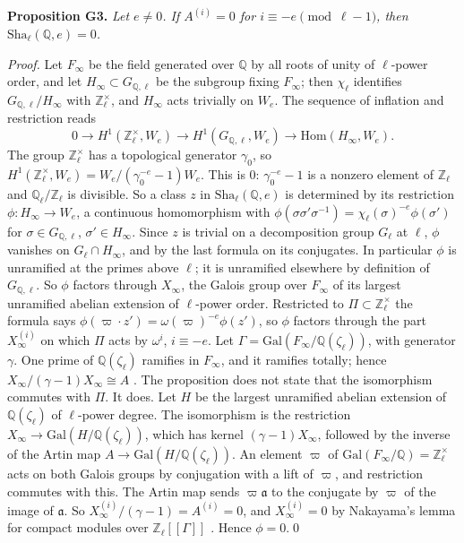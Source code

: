 \documentclass[11pt,letterpaper]{article}
\newcommand{\Z}{\mathbb Z}\newcommand{\Q}{\mathbb Q}\newcommand{\C}{\mathbb C}
\begin{document}
\textbf{Proposition G3.} \emph{Let $e\ne0$. If $A^{(i)}=0$ for $i\equiv-e\pmod{\ell-1}$, then
$\mathrm{Sha}_\ell(\Q,e)=0$.}

\emph{Proof.} Let $F_\infty$ be the field generated over $\Q$ by all roots of unity of $\ell$-power order,
and let $H_\infty\subset G_{\Q,\ell}$ be the subgroup fixing
$F_\infty$; then $\chi_\ell$ identifies $G_{\Q,\ell}/H_\infty$ with $\Z_\ell^\times$, and $H_\infty$ acts trivially on $W_e$.
The sequence of inflation and restriction reads
\begin{equation}\label{D:342}
 0\to H^1(\Z_\ell^\times,W_e)\to H^1(G_{\Q,\ell},W_e)\to\mathrm{Hom}(H_\infty,W_e).
\end{equation}
The group $\Z_\ell^\times$ has a topological generator $\gamma_0$, so $H^1(\Z_\ell^\times,W_e)=W_e/(\gamma_0^{-e}-1)W_e$.
This is $0$: $\gamma_0^{-e}-1$ is a nonzero element of $\Z_\ell$ and $\Q_\ell/\Z_\ell$ is divisible. So a class $z$
in $\mathrm{Sha}_\ell(\Q,e)$ is determined by its restriction $\phi\colon H_\infty\to W_e$, a continuous
homomorphism with $\phi(\sigma\sigma'\sigma^{-1})=\chi_\ell(\sigma)^{-e}\phi(\sigma')$ for $\sigma\in G_{\Q,\ell}$,
$\sigma'\in H_\infty$. Since $z$ is trivial on a decomposition group
$G_\ell$ at $\ell$, $\phi$ vanishes on $G_\ell\cap H_\infty$, and by the last formula on its conjugates. In particular $\phi$ is
unramified at the primes above $\ell$; it is unramified elsewhere by definition of $G_{\Q,\ell}$. So $\phi$
factors through $X_\infty$, the Galois group over $F_\infty$ of its largest unramified abelian extension of
$\ell$-power order. Restricted to $\Pi\subset\Z_\ell^\times$ the formula says
$\phi(\varpi\cdot z')=\omega(\varpi)^{-e}\phi(z')$, so $\phi$ factors through the part $X_\infty^{(i)}$ on
which $\Pi$ acts by $\omega^{i}$, $i\equiv-e$. Let $\Gamma=\mathrm{Gal}(F_\infty/\Q(\zeta_\ell))$, with
generator $\gamma$. One prime of $\Q(\zeta_\ell)$ ramifies in $F_\infty$, and it ramifies totally; hence
$X_\infty/(\gamma-1)X_\infty\cong A$ \cite[Prop.~13.22, at the bottom level]{Was82}. The proposition does not
state that the isomorphism commutes with $\Pi$. It does. Let $H$ be the largest unramified abelian extension
of $\Q(\zeta_\ell)$ of $\ell$-power degree. The isomorphism is the restriction
$X_\infty\to\mathrm{Gal}(H/\Q(\zeta_\ell))$, which has kernel $(\gamma-1)X_\infty$, followed by the inverse
of the Artin map $A\to\mathrm{Gal}(H/\Q(\zeta_\ell))$. An element $\varpi$ of
$\mathrm{Gal}(F_\infty/\Q)=\Z_\ell^\times$ acts on both Galois groups by conjugation with a lift of
$\varpi$, and restriction commutes with this. The Artin map sends $\varpi\mathfrak a$ to the conjugate by
$\varpi$ of the image of $\mathfrak a$. So
$X^{(i)}_\infty/(\gamma-1)=A^{(i)}=0$, and $X^{(i)}_\infty=0$ by Nakayama's lemma for compact modules over
$\Z_\ell[[\Gamma]]$ \cite[Lemma~13.16]{Was82}. Hence $\phi=0$.\qed
\end{document}
